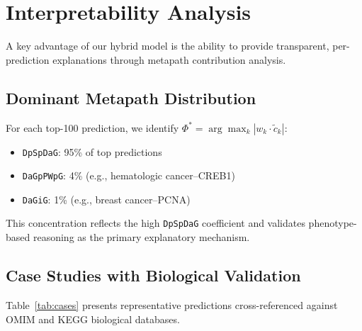 \documentclass{article}
\begin{document}
\section{Interpretability Analysis}
\label{sec:interpretability}

A key advantage of our hybrid model is the ability to provide transparent, per-prediction explanations through metapath contribution analysis.

\subsection{Dominant Metapath Distribution}

For each top-100 prediction, we identify $\Phi^* = \arg\max_k |w_k \cdot \tilde{c}_k|$:
\begin{itemize}
\item \texttt{DpSpDaG}: 95\% of top predictions
\item \texttt{DaGpPWpG}: 4\% (e.g., hematologic cancer--CREB1)
\item \texttt{DaGiG}: 1\% (e.g., breast cancer--PCNA)
\end{itemize}

This concentration reflects the high \texttt{DpSpDaG} coefficient and validates phenotype-based reasoning as the primary explanatory mechanism.

\subsection{Case Studies with Biological Validation}

Table~\ref{tab:cases} presents representative predictions cross-referenced against OMIM and KEGG biological databases.
\end{document}
